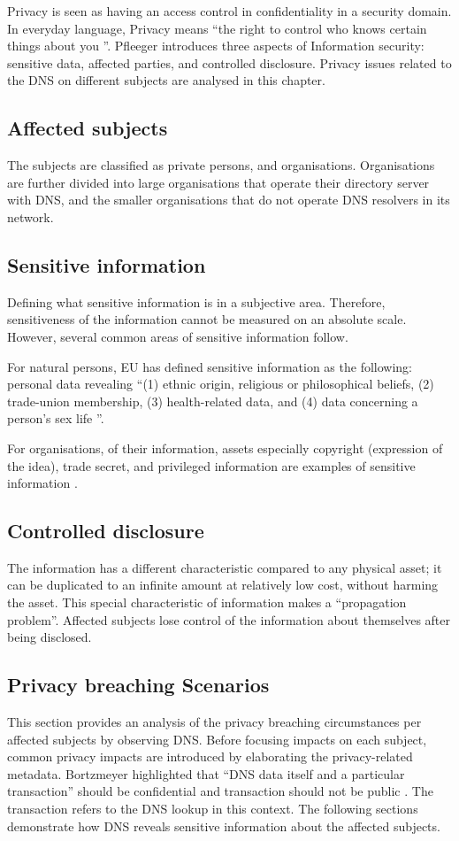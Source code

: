 Privacy is seen as having an access control in confidentiality in a security domain.
In everyday language, Privacy means ``the right to control who knows certain things about you \cite{securityincomputing}''.
Pfleeger introduces three aspects of Information security: sensitive data, affected parties, and controlled disclosure.
Privacy issues related to the DNS on different subjects are analysed in this chapter.

\subsection{Affected subjects}
The subjects are classified as private persons, and organisations. Organisations are further divided into large organisations that operate their directory server with DNS, and the smaller organisations that do not operate DNS resolvers in its network.

\subsection{Sensitive information}\label{sensitiveinformation}
Defining what sensitive information is in a subjective area.
Therefore, sensitiveness of the information cannot be measured on an absolute scale. However, several common areas of sensitive information follow.

For natural persons, EU has defined sensitive information as the following: personal data revealing ``(1) ethnic origin, religious or philosophical beliefs, (2) trade-union membership, (3) health-related data, and (4) data concerning a person's sex life \cite{GDPR}''.

For organisations, of their information, assets especially copyright (expression of the idea), trade secret, and privileged information are examples of sensitive information \cite{securityincomputing}.

\subsection{Controlled disclosure}
The information has a different characteristic compared to any physical asset; it can be duplicated to an infinite amount at relatively low cost, without harming the asset.
This special characteristic of information makes a ``propagation problem''.
Affected subjects lose control of the information about themselves after being disclosed.

\subsection{Privacy breaching Scenarios}
This section provides an analysis of the privacy breaching circumstances per affected subjects by observing DNS. Before focusing impacts on each subject, common privacy impacts are introduced by elaborating the privacy-related metadata.
Bortzmeyer highlighted that ``DNS data itself and a particular transaction'' should be confidential and transaction should not be public \cite{rfc7626}. The transaction refers to the DNS lookup in this context.
The following sections demonstrate how DNS reveals sensitive information about the affected subjects.

